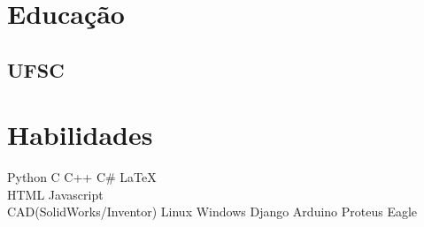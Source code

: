 \documentclass[letterpaper]{deedy-resume} %
\begin{document}
\begin{minipage}[t]{0.33\textwidth} %


\section{Educação} 

\subsection{UFSC}



\sectionspace %






\section{Habilidades}


Python \textbullet{} C  \textbullet{} C++ \textbullet{} C\# \textbullet{} \LaTeX\ \\ \textbullet{} HTML\textbullet{} Javascript \\
\textbullet CAD(SolidWorks/Inventor) \textbullet Linux \textbullet Windows \textbullet Django \textbullet Arduino \textbullet Proteus \textbullet Eagle



\end{minipage}
\end{document}
